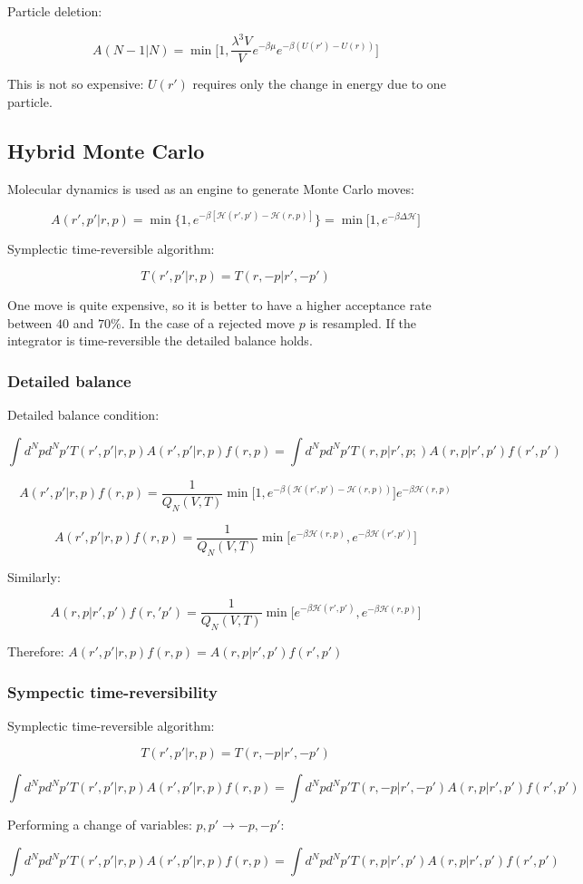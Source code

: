 	Particle deletion:

	$$A(N-1|N) = \min\biggl[1, \frac{\lambda^3V}{V}e^{-\beta\mu}e^{-\beta(U(r')-U(r))}\biggr]$$

	This is not so expensive: $U(r')$ requires only the change in energy due to one particle.

	\subsection{Hybrid Monte Carlo}
	Molecular dynamics is used as an engine to generate Monte Carlo moves:

	$$A(r', p' | r, p) = \min\{1, e^{-\beta[\mathcal{H}(r', p')-\mathcal{H}(r, p)]}\} = \min\bigl[1,e^{-\beta\Delta\mathcal{H}}\bigr]$$

	Symplectic time-reversible algorithm:

	$$T(r', p'|r, p) = T(r, -p|r', -p')$$

	One move is quite expensive, so it is better to have a higher acceptance rate between $40$ and $70\%$.
	In the case of a rejected move $p$ is resampled.
	If the integrator is time-reversible the detailed balance holds.

		\subsubsection{Detailed balance}
	Detailed balance condition:

		$$\int d^Npd^Np' T(r',p'|r,p)A(r',p'|r,p)f(r,p) = \int d^Npd^Np'T(r, p|r',p;)A(r,p|r',p')f(r',p')$$

		$$A(r',p'|r,p)f(r,p) = \frac{1}{Q_N(V, T)}\min\bigl[1, e^{-\beta(\mathcal{H}(r', p')-\mathcal{H}(r,p))}\bigr]e^{-\beta\mathcal{H}(r, p)}$$

		$$A(r',p'|r,p)f(r,p) = \frac{1}{Q_N(V, T)}\min\bigl[e^{-\beta\mathcal{H}(r, p)}, e^{-\beta\mathcal{H}(r', p')}\bigr]$$

		Similarly:

		$$A(r,p|r',p')f(r,'p') = \frac{1}{Q_N(V, T)}\min\bigl[e^{-\beta\mathcal{H}(r', p')}, e^{-\beta\mathcal{H}(r, p)}\bigr]$$

		Therefore: $A(r', p'|r, p)f(r, p) = A(r, p|r', p')f(r',p')$

		\subsubsection{Sympectic time-reversibility}
		Symplectic time-reversible algorithm:

		$$T(r', p'|r, p) = T(r, -p|r', -p')$$

		$$\int d^Npd^Np'T(r',p'|r, p)A(r', p'|r, p)f(r,p) = \int d^Npd^Np'T(r, -p|r', -p')A(r, p|r', p')f(r', p')$$

		Performing a change of variables: $p, p'\rightarrow -p, -p'$:

		$$\int d^Npd^Np'T(r',p'|r, p)A(r', p'|r, p)f(r,p) = \int d^Npd^Np'T(r,p|r', p')A(r, p|r', p')f(r',p')$$

